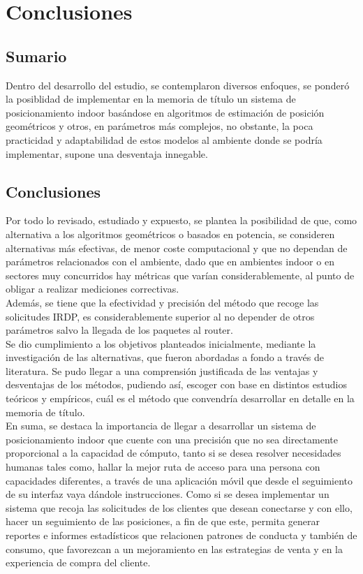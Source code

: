 \chapter{Conclusiones}

\section{Sumario}
Dentro del desarrollo del estudio, se contemplaron diversos enfoques, se ponderó la posiblidad de implementar en la memoria de título un sistema de posicionamiento indoor basándose en algoritmos de estimación de posición geométricos y otros, en parámetros más complejos, no obstante, la poca practicidad y adaptabilidad de estos modelos al ambiente donde se podría implementar, supone una desventaja innegable.

\section{Conclusiones}
Por todo lo revisado, estudiado y expuesto, se plantea la posibilidad de que, como alternativa a los algoritmos geométricos o basados en potencia, se consideren alternativas más efectivas, de menor coste computacional y que no dependan de parámetros relacionados con el ambiente, dado que en ambientes indoor o en sectores muy concurridos hay métricas que varían considerablemente, al punto de obligar a realizar mediciones correctivas.\\

Además, se tiene que la efectividad y precisión del método que recoge las solicitudes IRDP, es considerablemente superior al no depender de otros parámetros salvo la llegada de los paquetes al router.\\

Se dio cumplimiento a los objetivos planteados inicialmente, mediante la investigación de las alternativas, que fueron abordadas a fondo a través de literatura. Se pudo llegar a una comprensión justificada de las ventajas y desventajas de los métodos, pudiendo así, escoger con base en distintos estudios teóricos y empíricos, cuál es el método que convendría desarrollar en detalle en la memoria de título.\\

En suma, se destaca la importancia de llegar a desarrollar un sistema de posicionamiento indoor que cuente con una precisión que no sea directamente proporcional a la capacidad de cómputo, tanto si se desea resolver necesidades humanas tales como, hallar la mejor ruta de acceso para una persona con capacidades diferentes, a través de una aplicación móvil que desde el seguimiento de su interfaz vaya dándole instrucciones. Como si se desea implementar un sistema que recoja las solicitudes de los clientes que desean conectarse y con ello, hacer un seguimiento de las posiciones, a fin de que este, permita generar reportes e informes estadísticos que relacionen patrones de conducta y también de consumo, que favorezcan a un mejoramiento en las estrategias de venta y en la experiencia de compra del cliente.

